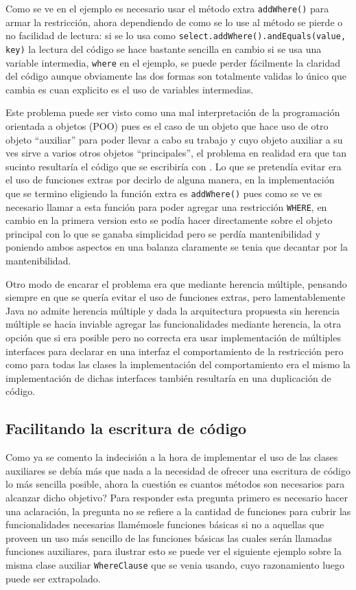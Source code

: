 Como se ve en el ejemplo es necesario usar el método extra \verb=addWhere()= para armar la restricción, ahora dependiendo de como se lo use al método se pierde o no facilidad de lectura:  si se lo usa como \verb=select.addWhere().andEquals(value, key)= la lectura del código se hace bastante sencilla en cambio si se usa una variable intermedia, \verb=where= en el ejemplo, se puede perder fácilmente la claridad del código aunque obviamente las dos formas son totalmente validas lo único que cambia es cuan explicito es el uso de variables intermedias.

Este problema puede ser visto como una mal interpretación de la programación orientada a objetos (POO) pues es el caso de un objeto que hace uso de otro objeto ``auxiliar'' para poder llevar a cabo su trabajo y cuyo objeto auxiliar a su ves sirve a varios otros objetos ``principales'', el problema en realidad era que tan sucinto resultaría el código que se escribiría con \jj. Lo que se pretendía evitar era el uso de funciones extras por decirlo de alguna manera, en la implementación que se termino eligiendo la función extra es \verb=addWhere()= pues como se ve es necesario llamar a esta función para poder agregar una restricción \verb=WHERE=, en cambio en la primera version esto se podía hacer directamente sobre el objeto principal con lo que se ganaba simplicidad pero se perdía mantenibilidad y poniendo ambos aspectos en una balanza claramente se tenia que decantar por la mantenibilidad.

Otro modo de encarar el problema era que mediante herencia múltiple, pensando siempre en que se quería evitar el uso de funciones extras, pero lamentablemente Java no admite herencia múltiple\cite{java:jdbc:tutorial} y dada la arquitectura propuesta sin herencia múltiple se hacia inviable agregar las funcionalidades mediante herencia, la otra opción que si era posible pero no correcta era usar implementación de múltiples interfaces para declarar en una interfaz el comportamiento de la restricción pero como para todas las clases la implementación del comportamiento era el mismo la implementación de dichas interfaces también resultaría en una duplicación de código.
%
\subsection{Facilitando la escritura de código}
\label{implementacion:manejador:facilitando}
Como ya se comento la indecisión a la hora de implementar el uso de las clases auxiliares se debía más que nada a la necesidad de ofrecer una escritura de código lo más sencilla posible, ahora la cuestión es cuantos métodos son necesarios para alcanzar dicho objetivo? Para responder esta pregunta primero es necesario hacer una aclaración, la pregunta no se refiere a la cantidad de funciones para cubrir las funcionalidades necesarias llamémosle funciones básicas si no a aquellas que proveen un uso más sencillo de las funciones básicas las cuales serán llamadas funciones auxiliares, para ilustrar esto se puede ver el siguiente ejemplo sobre la misma clase auxiliar \verb=WhereClause= que se venia usando, cuyo razonamiento luego puede ser extrapolado.

